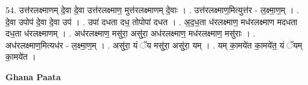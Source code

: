 \documentclass[17pt]{extarticle}
\begin{document}
54. उत्त॑रलक्ष्माणम् दे॒वा दे॒वा उत्त॑रलक्ष्माण॒ मुत्त॑रलक्ष्माणम् दे॒वाः । . उत्त॑रलक्ष्माण॒मित्युत्त॑र - ल॒क्ष्मा॒ण॒म् । . दे॒वा उपोप॑ दे॒वा दे॒वा उप॑ । . उपा॑ दधता दध॒ तोपोपा॑ दधत । . अ॒द॒ध॒ता ध॑रलक्ष्माण॒ मध॑रलक्ष्माण मदधता दध॒ता ध॑रलक्ष्माणम् । . अध॑रलक्ष्माण॒ मसु॑रा॒ असु॑रा॒ अध॑रलक्ष्माण॒ मध॑रलक्ष्माण॒ मसु॑राः । . अध॑रलक्ष्माण॒मित्यध॑र - ल॒क्ष्मा॒ण॒म् । . असु॑रा॒ यं ॅय मसु॑रा॒ असु॑रा॒ यम् । . यम् का॒मये॑त का॒मये॑त॒ यं ॅयम् का॒मये॑त । \newline

\textbf{Ghana Paata } \newline
\end{document}
